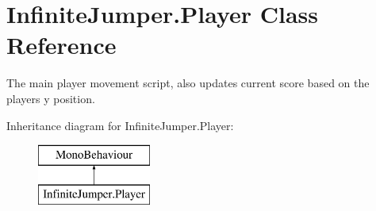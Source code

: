 \hypertarget{class_infinite_jumper_1_1_player}{}\section{Infinite\+Jumper.\+Player Class Reference}
\label{class_infinite_jumper_1_1_player}


The main player movement script, also updates current score based on the players y position.  


Inheritance diagram for Infinite\+Jumper.\+Player\+:\begin{figure}[H]
\begin{center}
\leavevmode
\includegraphics[height=2.000000cm]{class_infinite_jumper_1_1_player}
\end{center}
\end{figure}

